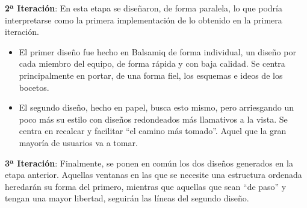 \documentclass[12pt]{article}
\begin{document}
\textbf{2ª Iteración}:
En esta etapa se diseñaron, de forma paralela, lo que podría interpretarse como la
primera implementación de lo obtenido en la primera iteración.
\begin{itemize}

\item El primer diseño fue hecho en Balsamiq de forma individual, un diseño por cada miembro del equipo, de forma rápida y con baja calidad. Se centra principalmente en portar, de una forma fiel, los esquemas e ideos de los bocetos.
\item El segundo diseño, hecho en papel, busca esto mismo, pero arriesgando un poco más su estilo con diseños redondeados más llamativos a la vista. Se centra en recalcar y facilitar “el camino más tomado”. Aquel que la gran mayoría de usuarios va a tomar.

\end{itemize}
\textbf{3ª Iteración}:
Finalmente, se ponen en común los dos diseños generados en la etapa anterior.
Aquellas ventanas en las que se necesite una estructura ordenada heredarán su forma del primero, mientras que aquellas que sean “de paso” y tengan una mayor libertad, seguirán las líneas del segundo diseño.
\end{document}
